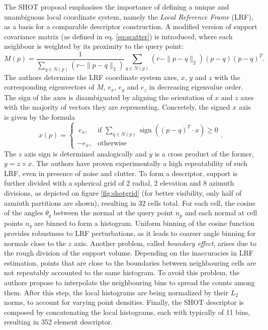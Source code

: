 The SHOT proposal emphasises the importance of defining a unique and unambiguous local coordinate system, namely the \textit{Local Reference Frame} (LRF), as a basis for a comparable descriptor construction. A modified version of support covariance matrix (as defined in eq. \ref{eq:scatter}) is introduced, where each neighbour is weighted by its proximity to the query point: 
\begin{equation}
\label{eq:weighCov}
M(p) = \frac{1}{\sum\limits_{q\in N(p)}(r - \|p-q\|_2)} \sum\limits_{q\in N(p)}(r - \|p-q\|_2)(p - q)(p - q)^T.
\end{equation}
The authors determine the LRF coordinate system axes, $x$, $y$ and $z$ with the corresponding eigenvectors of $M$, $e_x$, $e_y$ and $e_z$ in decreasing eigenvalue order. The sign of the axes is disambiguated by aligning the orientation of $x$ and $z$ axes with the majority of vectors they are representing. Concretely, the signed $x$ axis is given by the formula
\begin{equation}
x(p) = \begin{cases}\ e_x, & \mbox{if } \sum\limits_{q \in N(p)} \operatorname{sign}\left( (p-q)^T \cdot x \right) \geq 0 \\ -e_x, & \mbox{otherwise} \end{cases}.
\end{equation}
The $z$ axis sign is determined analogically and $y$ is a cross product of the former, $y = z \times x$. The authors have proven experimentally a high repeatability of such LRF, even in presence of noise and clutter. To form a descriptor, support is further divided with a spherical grid of 2 radial, 2 elevation and 8 azimuth divisions, as depicted on figure \ref{fig:shotgrid} (for better visibility, only half of azmiuth partitions are shown), resulting in 32 cells total.  For each cell, the cosine of the angles $\theta_q$ between the normal at the query point $n_p$ and each normal at cell points $n_q$ are binned to form a histogram. Uniform binning of the cosine function provides robustness to LRF perturbations, as it leads to coarser angle binning for normals close to the $z$ axis. Another problem, called \textit{boundary effect}, arises due to the rough division of the support volume. Depending on the inaccuracies in LRF estimation, points that are close to the boundaries between neighbouring cells are not repeatably accounted to the same histogram. To avoid this problem, the authors propose to interpolate the neighbouring bins to spread the counts among them. After this step, the local histograms are being normalized by their $L_2$ norms, to account for varying point densities. Finally, the SHOT descriptor is composed by concatenating the local histograms, each with typically of 11 bins, resulting in 352 element descriptor.


